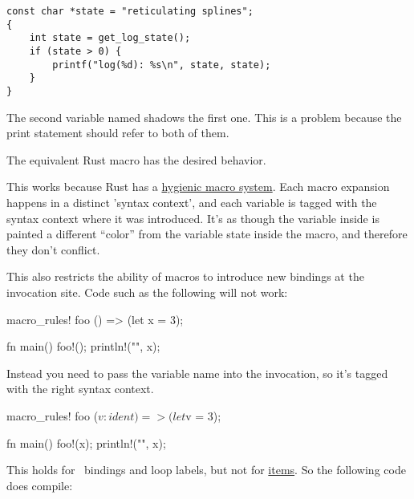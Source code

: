 \begin{verbatim}
const char *state = "reticulating splines";
{
    int state = get_log_state();
    if (state > 0) {
        printf("log(%d): %s\n", state, state);
    }
}
\end{verbatim}

The second variable named  shadows the first one. This is a problem because the print statement should refer to both of them.

\blank

The equivalent Rust macro has the desired behavior.


This works because Rust has a \href{https://en.wikipedia.org/wiki/Hygienic_macro}{hygienic macro system}. Each macro expansion happens 
in a distinct 'syntax context', and each variable is tagged with the syntax context where it was introduced. It's as though the variable 
 inside  is painted a different \enquote{color} from the variable state inside the macro, and therefore they 
don't conflict.

\blank

This also restricts the ability of macros to introduce new bindings at the invocation site. Code such as the following will not work:

\begin{rustc}
macro_rules! foo {
    () => (let x = 3);
}

fn main() {
    foo!();
    println!("{}", x);
}
\end{rustc}

Instead you need to pass the variable name into the invocation, so it's tagged with the right syntax context.

\begin{rustc}
macro_rules! foo {
    ($v:ident) => (let $v = 3);
}

fn main() {
    foo!(x);
    println!("{}", x);
}
\end{rustc}

This holds for \keylet\ bindings and loop labels, but not for \href{https://doc.rust-lang.org/reference.html#items}{items}. So the 
following code does compile:


